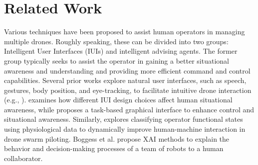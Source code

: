 \section{Related Work}

Various techniques have been proposed to assist human operators in managing multiple drones.  Roughly speaking, these can be divided into two groups: Intelligent User Interfaces (IUIs) and intelligent advising agents. The former group typically seeks to  assist the operator in gaining a better situational awareness and understanding and providing more efficient command and control capabilities. Several prior works explore natural user interfaces, such as speech, gestures, body position, and eye-tracking, to facilitate intuitive drone interaction (e.g., \cite{fernandez2016natural, implementation2020Brandon, natural2022marina}). \cite{agrawal2021explaining} examines how different IUI design choices affect human situational awareness, while \cite{chen2022multi} proposes a task-based graphical interface to enhance control and situational awareness. Similarly, \cite{kostenko2022supervised} explores classifying operator functional states using physiological data to dynamically improve human-machine interaction in drone swarm piloting.
Boggess et al. \cite{boggess2023explainable,boggess2022toward} propose XAI methods to explain the behavior and decision-making processes of a team of robots to a human collaborator.

